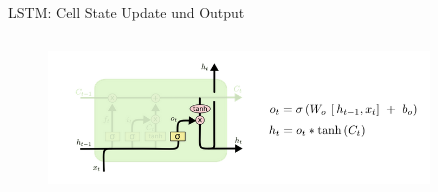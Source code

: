 \documentclass[aspectratio=1610, xcolor=dvipsnames, 9pt]{beamer}
\begin{document}
\begin{frame}{LSTM: Cell State Update und Output}
\begin{columns}
\begin{column}{0.4\textwidth}
\begin{figure}
                \end{figure}
                \begin{figure}
                  \centering
                              \includegraphics[width=0.9\textwidth]{images/LSTM_6.png}
                  \end{figure}
           \end{column}
        \end{columns}
      \end{frame} 
\end{document}
